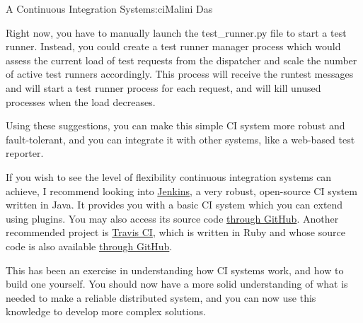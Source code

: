 \begin{aosachapter}{A Continuous Integration System}{s:ci}{Malini Das}
\label{test-runner-manager}

Right now, you have to manually launch the test\_runner.py file to start
a test runner. Instead, you could create a test runner manager process
which would assess the current load of test requests from the dispatcher
and scale the number of active test runners accordingly. This process
will receive the runtest messages and will start a test runner process
for each request, and will kill unused processes when the load
decreases.

Using these suggestions, you can make this simple CI system more robust
and fault-tolerant, and you can integrate it with other systems, like a
web-based test reporter.

If you wish to see the level of flexibility continuous integration
systems can achieve, I recommend looking into
\href{http://jenkins-ci.org/}{Jenkins}, a very robust, open-source CI
system written in Java. It provides you with a basic CI system which you
can extend using plugins. You may also access its source code
\href{https://github.com/jenkinsci/jenkins/}{through GitHub}. Another
recommended project is \href{https://travis-ci.org/}{Travis CI}, which
is written in Ruby and whose source code is also available
\href{https://github.com/travis-ci/travis-ci}{through GitHub}.

This has been an exercise in understanding how CI systems work, and how
to build one yourself. You should now have a more solid understanding of
what is needed to make a reliable distributed system, and you can now
use this knowledge to develop more complex solutions.

\end{aosachapter}
